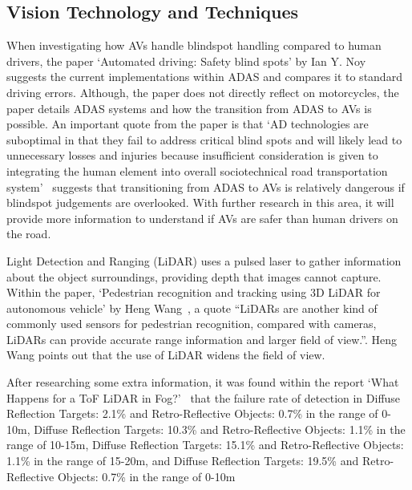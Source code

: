 \documentclass[12pt]{report} %
\begin{document}
	\subsection{Vision Technology and Techniques}
		When investigating how AVs handle blindspot handling compared to human drivers, the paper `Automated driving: Safety blind spots' by Ian Y. Noy~\cite{noy_automated_2018} suggests the current implementations within ADAS and compares it to standard driving errors. Although, the paper does not directly reflect on motorcycles, the paper details ADAS systems and how the transition from ADAS to AVs is possible. An important quote from the paper is that `AD technologies are suboptimal in that they fail to address critical blind spots and will likely lead to unnecessary losses and injuries because insufficient consideration is given to integrating the human element into overall sociotechnical road transportation system'~\cite{noy_automated_2018} suggests that transitioning from ADAS to AVs is relatively dangerous if blindspot judgements are overlooked. With further research in this area, it will provide more information to understand if AVs are safer than human drivers on the road.

		Light Detection and Ranging (LiDAR) uses a pulsed laser to gather information about the object surroundings, providing depth that images cannot capture. Within the paper, `Pedestrian recognition and tracking using 3D LiDAR for autonomous vehicle' by Heng Wang~\cite{wang_pedestrian_2017}, a quote ``LiDARs are another kind of commonly used sensors for pedestrian recognition, compared with cameras, LiDARs can provide accurate range information and larger field of view.''. Heng Wang points out that the use of LiDAR widens the field of view.
		
		After researching some extra information, it was found within the report `What Happens for a ToF LiDAR in Fog?'~\cite{li_what_2021} that the failure rate of detection in Diffuse Reflection Targets: 2.1\% and Retro-Reflective Objects: 0.7\% in the range of 0-10m, Diffuse Reflection Targets: 10.3\% and Retro-Reflective Objects: 1.1\% in the range of 10-15m, Diffuse Reflection Targets: 15.1\% and Retro-Reflective Objects: 1.1\% in the range of 15-20m, and Diffuse Reflection Targets: 19.5\% and Retro-Reflective Objects: 0.7\% in the range of 0-10m~\cite{royo_overview_2019}
\end{document}
